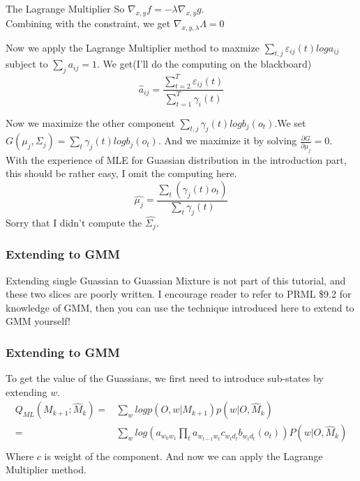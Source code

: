 \documentclass{beamer}
\begin{document}
\begin{frame}
\begin{block}{The Lagrange Multiplier}
So $\nabla_{x,y}f =  - \lambda \nabla_{x,y}g$.\\
Combining with the constraint, we get $\nabla_{x,y,\lambda}\Lambda = 0$
\end{block}
Now we apply the Lagrange Multiplier method to maxmize $\sum_{t,j} \varepsilon_{ij}(t)loga_{ij}$ subject to $\sum_j a_{ij} = 1$. We get(I'll do the computing on the blackboard)
\begin{equation}
\hat{a}_{ij} = \frac{\sum^{T}_{t=2}\varepsilon_{ij}(t)}{\sum^{T}_{t=1}\gamma_i(t)}
\end{equation}
\end{frame}

\begin{frame}
Now we maximize the other component $\sum_{t,j} \gamma_j(t)logb_j(o_t)$.We set $G(\mu_j, \Sigma_j) = \sum_{t} \gamma_j(t)logb_j(o_t)$. And we maximize it by solving $\frac{\partial G}{\partial \mu_j}=0$. \\
With the experience of MLE for Guassian distribution in the introduction part, this should be rather easy, I omit the computing here.
\begin{equation}
\hat{\mu_j} = \frac{\sum_t(\gamma_j(t)o_t)}{\sum_t\gamma_j(t)}
\end{equation}
Sorry that I didn't compute the $\hat{\Sigma_j}$.
\end{frame}



\begin{frame}
\frametitle{Extending to GMM}
Extending single Guassian to Guassian Mixture is not part of this tutorial, and these two slices are poorly written. I encourage reader to refer to PRML \$9.2 for knowledge of GMM, then you can use the technique introduced here to extend to GMM yourself!
\end{frame}
\begin{frame}
\frametitle{Extending to GMM}
To get the value of the Guassians, we first need to introduce sub-states by extending $w$.
	\begin{equation}
	\begin{split}
		Q_{ML}(M_{k+1};\hat{M}_{k}) = &\sum_w logp(O,w|M_{k+1})p(w|O,\hat{M}_k) \\
                            = &\sum_w log(a_{w_0w_1}\prod_ta_{w_{t-1}w_t}c_{w_td_t}b_{w_td_t}(o_t)) P(w|O, \hat{M}_k) \\
	\end{split}
	\end{equation}
Where $c$ is weight of the component.
And now we can apply the Lagrange Multiplier method.
\end{frame}
\end{document}
